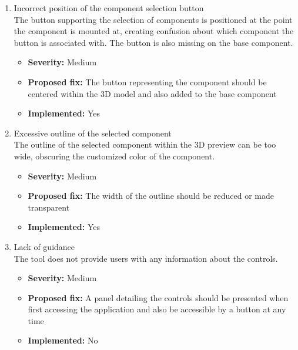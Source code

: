 \begin{enumerate}[label=\textbf{I\arabic*:}, leftmargin=27pt]
    \item Incorrect position of the component selection button
        \vspace{2pt}
        \\The button supporting the selection of components is positioned at the point the component is mounted at, creating confusion about which component the button is associated with. The button is also missing on the base component.
        \begin{itemize}[noitemsep, label=\trianglebullet]
            \item \textbf{Severity:} Medium
            \item \textbf{Proposed fix:} The button representing the component should be centered within the 3D model and also added to the base component
            \item \textbf{Implemented:} Yes
        \end{itemize}
        \vspace{4pt}

    \item Excessive outline of the selected component
        \vspace{2pt}
        \\The outline of the selected component within the 3D preview can be too wide, obscuring the customized color of the component.
        \begin{itemize}[noitemsep, label=\trianglebullet]
            \item \textbf{Severity:} Medium
            \item \textbf{Proposed fix:} The width of the outline should be reduced or made transparent
            \item \textbf{Implemented:} Yes
        \end{itemize}
        \vspace{4pt}

    \item Lack of guidance
        \vspace{2pt}
        \\The tool does not provide users with any information about the controls.
        \begin{itemize}[noitemsep, label=\trianglebullet]
            \item \textbf{Severity:} Medium
            \item \textbf{Proposed fix:} A panel detailing the controls should be presented when first accessing the application and also be accessible by a button at any time
            \item \textbf{Implemented:} No
        \end{itemize}
        \vspace{4pt}


\end{enumerate}
